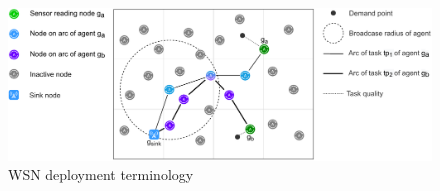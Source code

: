 \newcommand{\varLocation}[2]{\varSymbol{loc}{#1}{#2}}
\newcommand{\setLocation}[2]{\setSymbol{LOC}{#1}{#2}}
\newcommand{\formalVarLocation}[2]{(x,y)}
\newcommand{\formalSetLocation}[2]{(\setRealNumbers{}{} \times \setRealNumbers{}{})}

\newcommand{\functionDeployment}[2]{
\ifx \\1\\
\functionSignature{conf}{\setAgents{}{}}
\else
\functionSignature{conf}{#1}
\fi 
}
\newcommand{\formalDeployment}[2]{\functionFormal{conf}{\setAgents{}{}}{(\setRealNumbers{}{} \times \setRealNumbers{}{})}}
\newcommand{\functionTaskArc}[2]{\functionSignature{arc}{\varAtomicTask{}{}}}
\newcommand{\formalTaskArc}[2]{\functionFormal{arc}{\setAtomicTask{}{}}{\powerSetAgents{}{}}}
\newcommand{\functionTaskDemandPoint}[2]{\functionSignature{dp}{\varAtomicTask{}{}}}
\newcommand{\formalTaskDemandPoint}[2]{\functionFormal{dp}{\setAtomicTask{}{}}{(\setRealNumbersNonNegative{}{} \times \setRealNumbersNonNegative)}}
\newcommand{\varActiveAgent}[2]{\varAgent{#1}{\oplus}}
\newcommand{\varInactiveAgent}[2]{\varAgent{#1}{\ominus}}
\newcommand{\varSensingAgent}[2]{\varAgent{#1}{\ast}}
\newcommand{\varSinkAgent}[2]{\varAgent{#1}{\Delta}}

\newcommand{\varEnergy}[2]{\varSymbol{e}{#1}{#2}}
\newcommand{\setEnergy}[2]{\setSymbol{E}{#1}{#2}}
\newcommand{\varResource}[2]{\varSymbol{r}{#1}{#2}}
\newcommand{\setResource}[2]{\setSymbol{R}{#1}{#2}}
\newcommand{\formalTaskResourceAllocation}[2]{
	\functionFormal{ra_{\varAgent{}{}}}
	{\setAtomicTask{}{}}
	{\powerSetSymbol{\setResource{}{} \times \setRealNumbersNonNegative{}{}}{}{}}
}
\newcommand{\functionTaskResourceAllocation}[2]{
	\functionSignature{ra_{\varAgent{}{}}}
	{\varAtomicTask{}{}}
}



\begin{figure}
\centering 
\includegraphics[width=0.9\linewidth]{grid_concept}
\caption[WSN deployment terminology]{WSN deployment terminology}
\label{fig:gridconcept}
\end{figure}

